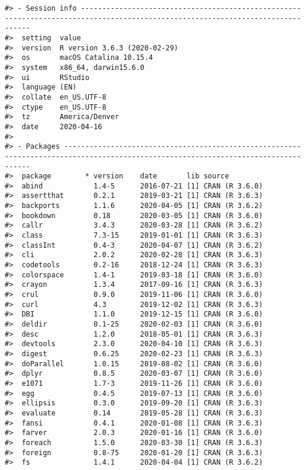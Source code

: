 \documentclass[
]{sa}
\begin{document}
\begin{verbatim}
#> - Session info --------------------------------------------------------------------------------------------------------------------------------
#>  setting  value                       
#>  version  R version 3.6.3 (2020-02-29)
#>  os       macOS Catalina 10.15.4      
#>  system   x86_64, darwin15.6.0        
#>  ui       RStudio                     
#>  language (EN)                        
#>  collate  en_US.UTF-8                 
#>  ctype    en_US.UTF-8                 
#>  tz       America/Denver              
#>  date     2020-04-16                  
#> 
#> - Packages ------------------------------------------------------------------------------------------------------------------------------------
#>  package        * version    date       lib source        
#>  abind            1.4-5      2016-07-21 [1] CRAN (R 3.6.0)
#>  assertthat       0.2.1      2019-03-21 [1] CRAN (R 3.6.3)
#>  backports        1.1.6      2020-04-05 [1] CRAN (R 3.6.2)
#>  bookdown         0.18       2020-03-05 [1] CRAN (R 3.6.0)
#>  callr            3.4.3      2020-03-28 [1] CRAN (R 3.6.2)
#>  class            7.3-15     2019-01-01 [1] CRAN (R 3.6.3)
#>  classInt         0.4-3      2020-04-07 [1] CRAN (R 3.6.2)
#>  cli              2.0.2      2020-02-28 [1] CRAN (R 3.6.3)
#>  codetools        0.2-16     2018-12-24 [1] CRAN (R 3.6.3)
#>  colorspace       1.4-1      2019-03-18 [1] CRAN (R 3.6.0)
#>  crayon           1.3.4      2017-09-16 [1] CRAN (R 3.6.3)
#>  crul             0.9.0      2019-11-06 [1] CRAN (R 3.6.0)
#>  curl             4.3        2019-12-02 [1] CRAN (R 3.6.3)
#>  DBI              1.1.0      2019-12-15 [1] CRAN (R 3.6.0)
#>  deldir           0.1-25     2020-02-03 [1] CRAN (R 3.6.0)
#>  desc             1.2.0      2018-05-01 [1] CRAN (R 3.6.3)
#>  devtools         2.3.0      2020-04-10 [1] CRAN (R 3.6.3)
#>  digest           0.6.25     2020-02-23 [1] CRAN (R 3.6.3)
#>  doParallel       1.0.15     2019-08-02 [1] CRAN (R 3.6.0)
#>  dplyr            0.8.5      2020-03-07 [1] CRAN (R 3.6.0)
#>  e1071            1.7-3      2019-11-26 [1] CRAN (R 3.6.0)
#>  egg              0.4.5      2019-07-13 [1] CRAN (R 3.6.0)
#>  ellipsis         0.3.0      2019-09-20 [1] CRAN (R 3.6.3)
#>  evaluate         0.14       2019-05-28 [1] CRAN (R 3.6.3)
#>  fansi            0.4.1      2020-01-08 [1] CRAN (R 3.6.3)
#>  farver           2.0.3      2020-01-16 [1] CRAN (R 3.6.0)
#>  foreach          1.5.0      2020-03-30 [1] CRAN (R 3.6.3)
#>  foreign          0.8-75     2020-01-20 [1] CRAN (R 3.6.3)
#>  fs               1.4.1      2020-04-04 [1] CRAN (R 3.6.2)

\end{verbatim}
\end{document}
